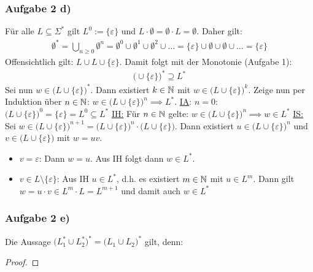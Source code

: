 \subsubsection{Aufgabe 2 d)}
Für alle $L\subseteq\Sigma^\ast$ gilt $L^0:=\lbrace\varepsilon\rbrace$ und $L\cdot\emptyset=\emptyset\cdot L=\emptyset$. Daher gilt:
\begin{align*}
	\emptyset^\ast=\bigcup\limits_{n\geq0}\emptyset^n=\emptyset^0\cup\emptyset^1\cup\emptyset^2\cup\ldots=\lbrace\varepsilon\rbrace\cup\emptyset\cup\emptyset\cup\ldots=\lbrace\varepsilon\rbrace
\end{align*}
Offensichtlich gilt: $L\cup L\cup\lbrace\varepsilon\rbrace$. 
Damit folgt mit der Monotonie (Aufgabe 1):
\begin{align*}
	\big(\cup\lbrace\varepsilon\rbrace\big)^\ast\supseteq L^\ast
\end{align*}
Sei nun $w\in \big(L\cup\lbrace\varepsilon\rbrace\big)^\ast$. 
Dann existiert $k\in\mathbb{N}$ mit $w\in\big(L\cup\lbrace\varepsilon\rbrace\big)^k$. 
Zeige nun per Induktion über $n\in\mathbb{N}$: $w\in\big(L\cup\lbrace\varepsilon\rbrace\big)^n\implies L^\ast$.\nl
\ul{IA}: $n=0$: $\big(L\cup\lbrace\varepsilon\rbrace\big)^0=\lbrace\varepsilon\rbrace=L^0\subseteq L^\ast$\nl
\ul{IH:} Für $n\in\mathbb{N}$ gelte: $w\in\big(L\cup\lbrace\varepsilon\rbrace\big)^n\implies w\in L^\ast$\nl
\ul{IS:} Sei $w\in\big(L\cup\lbrace\varepsilon\rbrace\big)^{n+1}=\big(L\cup\lbrace\varepsilon\rbrace\big)^n\cdot\big(L\cup\lbrace\varepsilon\rbrace\big)$. Dann existiert $u\in\big(L\cup\lbrace\varepsilon\rbrace\big)^n$ und $v\in\big(L\cup\lbrace\varepsilon\rbrace\big)$ mit $w=uv$.

\begin{itemize}
	\item $v=\varepsilon$: Dann $w=u$. Aus IH folgt dann $w\in L^\ast$.
	\item $v\in L\setminus\lbrace\varepsilon\rbrace$: Aus IH $u\in L^\ast$, d.h. es existiert $m\in\mathbb{N}$ mit $u\in L^m$. 
	Dann gilt $w=u\cdot v\in L^m\cdot L=L^{m+1}$ und damit auch $w\in L^\ast$
\end{itemize}

\subsubsection{Aufgabe 2 e)}
Die Aussage $\big(L_1^\ast\cup L_2^\ast\big)^\ast=\big(L_1\cup L_2\big)^\ast$ gilt, denn:
\begin{proof}
\end{proof}

